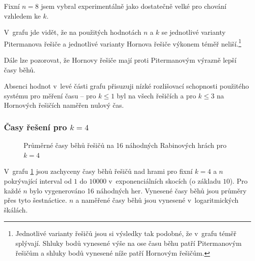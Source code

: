Fixní $n = 8$ jsem vybral experimentálně jako dostatečně velké pro  chování vzhledem ke $k$.

V~grafu jde vidět, že na použitých hodnotách $n$ a $k$ se jednotlivé varianty Pitermanova řešiče a jednotlivé varianty Hornova řešiče výkonem téměř neliší.\footnote{Jednotlivé varianty řešičů jsou si výsledky tak podobné, že v~grafu téměř splývají. Shluky bodů vynesené výše na ose času běhu patří Pitermanovým řešičům a shluky bodů vynesené níže patří Hornovým řešičům.}

Dále lze pozorovat, že Hornovy řešiče mají proti Pitermanovým výrazně lepší časy běhů.

Absenci hodnot v~levé části grafu přisuzuji nízké rozlišovací schopnosti použitého systému pro měření času -- pro $k \leq 1$ byl na všech řešičích a pro $k \leq 3$ na Hornových řešičích naměřen nulový čas.
\subsubsection{Časy řešení pro $k = 4$}
\begin{figure}[htbp]
\centering
{}
\caption{Průměrné časy běhů řešičů na 16 náhodných Rabinových hrách pro $k = 4$}
\label{fig:k4nexp}
\end{figure}
V~grafu \ref{fig:k4nexp} jsou zachyceny časy běhů řešičů nad hrami pro fixní $k = 4$ a $n$ pokrývající interval od $1$ do $10000$ v~exponenciálních skocích (o základu $10$). Pro každé $n$ bylo vygenerováno 16 náhodných her. Vynesené časy běhů jsou průměry přes tyto šestnáctice. $n$ a naměřené časy běhů jsou vynesené v~logaritmických škálách.

